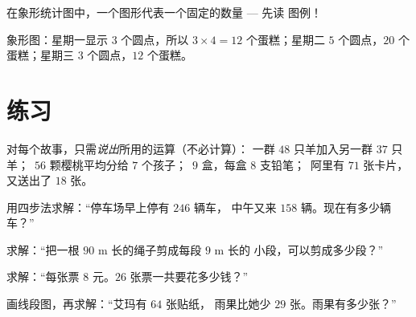 \begin{example}[象形统计图]\label{ex:g3:problems:pictogram}
在象形统计图中，一个图形代表一个固定的数量 --- 先读
图例！

\begin{omfigure}

{\small 象形图：星期一显示 $3$ 个圆点，所以 $3 \times 4 = 12$
个蛋糕；星期二 $5$ 个圆点，$20$ 个蛋糕；星期三 $3$ 个圆点，$12$
个蛋糕。}
\end{omfigure}
\end{example}

\section{练习}

\begin{exercise}[$\star$]\label{exo:g3:problems:1}
对每个故事，只需\emph{说出}所用的运算（不必计算）：
一群 $48$ 只羊加入另一群 $37$ 只羊；\ $56$ 颗樱桃平均分给
$7$ 个孩子；\ $9$ 盒，每盒 $8$ 支铅笔；\ 阿里有 $71$ 张卡片，
又送出了 $18$ 张。
\end{exercise}

\begin{exercise}[$\star$]\label{exo:g3:problems:2}
用四步法求解：“停车场早上停有 $246$ 辆车，
中午又来 $158$ 辆。现在有多少辆车？”
\end{exercise}

\begin{exercise}[$\star$]\label{exo:g3:problems:3}
求解：“把一根 $90$ m 长的绳子剪成每段 $9$ m 长的
小段，可以剪成多少段？”
\end{exercise}

\begin{exercise}[$\star$]\label{exo:g3:problems:4}
求解：“每张票 $8$ 元。$26$ 张票一共要花多少钱？”
\end{exercise}

\begin{exercise}[$\star$]\label{exo:g3:problems:5}
画线段图，再求解：“艾玛有 $64$ 张贴纸，
雨果比她少 $29$ 张。雨果有多少张？”
\end{exercise}

